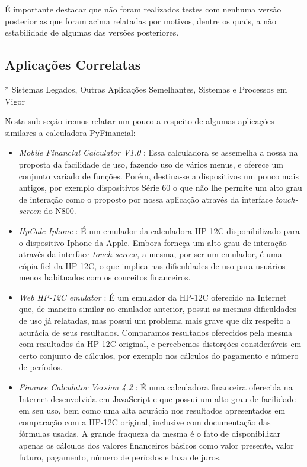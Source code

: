 É importante destacar que não foram realizados testes com nenhuma versão posterior as que foram acima relatadas por motivos, dentre os quais, a não estabilidade de algumas das versões posteriores.


\subsection{Aplicações Correlatas}

* Sistemas Legados, Outras Aplicações Semelhantes, Sistemas e Processos em Vigor

Nesta sub-seção iremos relatar um pouco a respeito de algumas aplicações similares a calculadora PyFinancial:

\begin{itemize}

 \item \textit{Mobile Financial Calculator V1.0} \cite{mobcalc}: Essa calculadora se assemelha a nossa na proposta da facilidade de uso, fazendo uso de vários menus, e oferece um conjunto variado de funções. Porém, destina-se a dispositivos um pouco mais antigos, por exemplo dispositivos Série 60 \cite{s60} o que não lhe permite um alto grau de interação como o proposto por nossa aplicação através da interface \textit{touch-screen} do N800.

 \item \textit{HpCalc-Iphone} \cite{hpiphone}: É um emulador da calculadora HP-12C disponibilizado para o dispositivo Iphone da Apple. Embora forneça um alto grau de interação através da interface \textit{touch-screen}, a mesma, por ser um emulador, é uma cópia fiel da HP-12C, o que implica nas dificuldades de uso para usuários menos habituados com os conceitos financeiros.

 \item \textit{Web HP-12C emulator} \cite{epxcalc}: É um emulador da HP-12C oferecido na Internet que, de maneira similar ao emulador anterior, possui as mesmas dificuldades de uso já relatadas, mas possui um problema mais grave que diz respeito a acurácia de seus resultados. Comparamos resultados oferecidos pela mesma com resultados da HP-12C original, e percebemos distorções consideráveis em certo conjunto de cálculos, por exemplo nos cálculos do pagamento e número de períodos.

 \item \textit{Finance Calculator Version 4.2} \cite{arachnoid}: É uma calculadora financeira oferecida na Internet desenvolvida em JavaScript e que possui um alto grau de facilidade em seu uso, bem como uma alta acurácia nos resultados apresentados em comparação com a HP-12C original, inclusive com documentação das fórmulas usadas. A grande fraqueza da mesma é o fato de disponibilizar apenas os cálculos dos valores financeiros básicos como valor presente, valor futuro, pagamento, número de períodos e taxa de juros.

\end{itemize}

